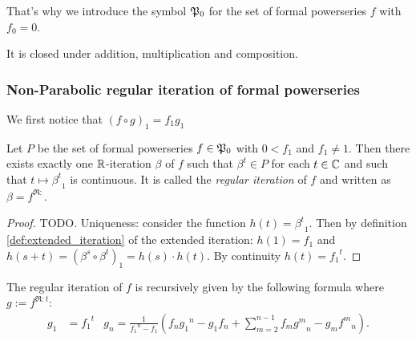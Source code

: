 \documentclass{article}
\numberwithin{equation}{section}
\begin{document}
\begin{definition}[$\pso$]
  That's why we introduce the symbol $\pso$ for the set of formal powerseries $f$ with $f_0=0$.
\end{definition}
It is closed under addition, multiplication and composition.

\subsubsection{Non-Parabolic regular iteration of formal powerseries}
\label{sec:Non-parabolic powerseries}

We first notice that $(f\circ g)_1 = f_1g_1$ 

\newcommand{\regitn}[1]{{#1}^{\mathfrak{R}:}}
\newcommand{\regitOn}[2]{{#1}^{\mathfrak{R}#2:}}
\newcommand{\regitO}[2]{{#1}^{\mathfrak{R}:#2}}
\newcommand{\regit}[3]{{#1}^{\mathfrak{R}#2:#3}}
\begin{wellknown}
  \label{wk:iteration:powerseries:non-parabolic:real}
  Let $P$ be the set of formal powerseries $f\in\mathfrak{P}_0$ with $0<{f_1}$
  and $f_1\neq 1$. Then there exists exactly one $\mathbb{R}$-iteration $\beta$
  of $f$ such that $\beta^t \in P$ for each $t\in\mathbb{C}$ and such
  that $t\mapsto {\beta^t}_1$ is continuous. It is
  called the {\em regular iteration} of $f$ and written as
  $\beta=\regitn{f}$. 
\end{wellknown}
\begin{proof}TODO.
Uniqueness: consider the function $h(t)={\beta^t}_1$. Then by
definition \ref{def:extended_iteration} of the extended iteration:
$h(1)=f_1$ and $h(s+t)=(\beta^s\circ \beta^t)_1= h(s)\cdot h(t)$. By
continuity $h(t)={f_1}^t$.
\end{proof}

The regular iteration of $f$ is recursively given by the
following formula where $g:=\regitO{f}{t}$: 
\begin{align}\label{eq:non-parabolic:powerseries}
  g_1 &= {f_1}^t & g_n = \frac{1}{{f_1}^n - f_1} \left(
    f_n {g_1}^n - g_1 f_n + \sum_{m=2}^{n-1} f_m {g^m}_n - g_m
    {f^m}_n
  \right)
.\end{align}
\end{document}
